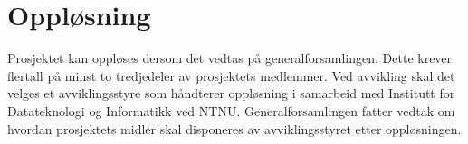 \section{Oppløsning}\label{sec:oppløsning}
Prosjektet kan oppløses dersom det vedtas på generalforsamlingen.
Dette krever flertall på minst to tredjedeler av prosjektets medlemmer.
Ved avvikling skal det velges et avviklingsstyre som håndterer oppløsning i samarbeid med Institutt for Datateknologi og Informatikk ved NTNU.\@
Generalforsamlingen fatter vedtak om hvordan prosjektets midler skal disponeres av avviklingsstyret etter oppløsningen.

